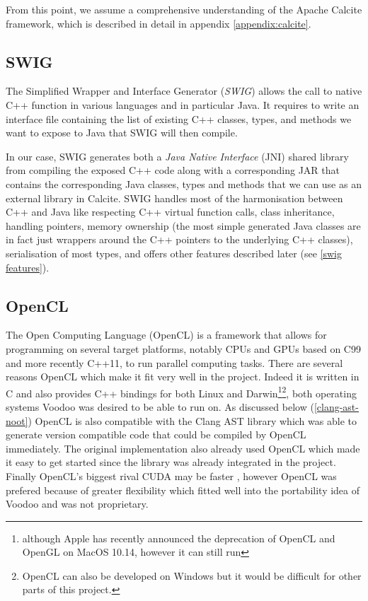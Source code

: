 From this point, we assume a comprehensive understanding of the Apache Calcite framework, which is described in detail in appendix \ref{appendix:calcite}.

\subsection{SWIG\label{swig}}

The Simplified Wrapper and Interface Generator (\emph{SWIG}) \cite{Beazley:1996:SEU:1267498.1267513} allows the call to native C++ function in various languages and in particular Java. It requires to write an interface file containing the list of existing C++ classes, types, and methods we want to expose to Java that SWIG will then compile.

In our case, SWIG generates both a \emph{Java Native Interface} (JNI) shared library from compiling the exposed C++ code along with a corresponding JAR that contains the corresponding Java classes, types and methods that we can use as an external library in Calcite. SWIG handles most of the harmonisation between C++ and Java like respecting C++ virtual function calls, class inheritance, handling pointers, memory ownership (the most simple generated Java classes are in fact just wrappers around the C++ pointers to the underlying C++ classes), serialisation of most types, and offers other features described later (see \ref{swig features}).

\subsection{OpenCL}

The Open Computing Language (OpenCL) is a framework that allows for programming on several target platforms, notably CPUs and GPUs based on C99 and more recently C++11, to run parallel computing tasks. There are several reasons OpenCL which make it fit very well in the project. Indeed it is written in C and also provides C++ bindings for both Linux and Darwin\footnote{although Apple has recently announced the deprecation of OpenCL and OpenGL on MacOS 10.14, however it can still run}\footnote{OpenCL can also be developed on Windows but it would be difficult for other parts of this project.}, both operating systems Voodoo was desired to be able to run on. As discussed below (\ref{clang-ast-noot}) OpenCL is also compatible with the Clang AST library which was able to generate version compatible code that could be compiled by OpenCL immediately. The original implementation also already used OpenCL which made it easy to get started since the library was already integrated in the project. Finally OpenCL's biggest rival CUDA may be faster \cite{article}, however OpenCL was prefered because of greater flexibility which fitted well into the portability idea of Voodoo and was not proprietary.

